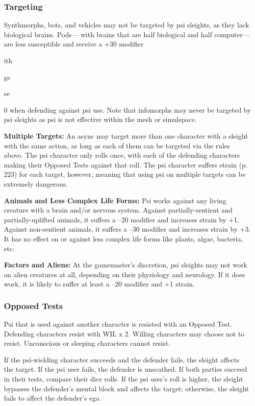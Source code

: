 \subsubsection{Targeting}

Synthmorphs, bots, and vehicles may not be targeted 
by psi sleights, as they lack biological brains. Pods—
with brains that are half biological and half computer—are
less susceptible and receive a +30 modifier

ith

ge

se

0
when defending against psi use. Note that infomorphs 
may never be targeted by psi sleights as psi is not effective
within the mesh or simulspace.

\textbf{Multiple Targets:} An async may target more than 
one character with a sleight with the same action, as 
long as each of them can be targeted via the rules 
above. The psi character only rolls once, with each of 
the defending characters making their Opposed Tests 
against that roll. The psi character suffers strain (p. 
223) for each target, however, meaning that using psi 
on multiple targets can be extremely dangerous.

\textbf{Animals and Less Complex Life Forms:} Psi works 
against any living creature with a brain and/or 
nervous system. Against partially-sentient and partially-uplifted
animals, it suffers a –20 modifier and
increases strain by +1. Against non-sentient animals, 
it suffers a –30 modifier and increases strain by +3. It 
has no effect on or against less complex life forms like 
plants, algae, bacteria, etc.

\textbf{Factors and Aliens:} At the gamemaster's discretion, 
psi sleights may not work on alien creatures at all, depending
on their physiology and neurology. If it does
work, it is likely to suffer at least a –20 modifier and 
+1 strain.

\subsubsection{Opposed Tests}

Psi that is used against another character is resisted 
with an Opposed Test. Defending characters resist with 
WIL x 2. Willing characters may choose not to resist. 
Unconscious or sleeping characters cannot resist.

If the psi-wielding character succeeds and the defender
fails, the sleight affects the target. If the psi user
fails, the defender is unscathed. If both parties succeed
in their tests, compare their dice rolls. If the psi
user's roll is higher, the sleight bypasses the defender's 
mental block and affects the target; otherwise, the 
sleight fails to affect the defender's ego.

